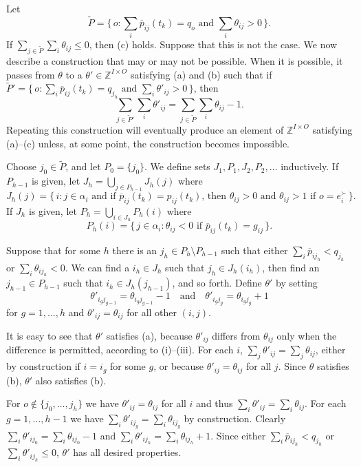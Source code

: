\documentclass[12pt]{article}
\theoremstyle{definition}
\newcommand{\In}{\mathbb{Z}}
\newcommand{\barp}{\overline{p}}
\newcommand{\tP}{{\tilde P}}
\begin{document}
\begin{appendix}
Let $$\tP = \{\, o : \text{$\sum_i \barp_{ij}(t_k) = q_{o}$ and
  $\sum_i \theta_{ij} > 0$} \,\}.$$ If $\sum_{j \in \tP} \sum_i
\theta_{ij} \le 0$, then (c) holds.  Suppose that this is not the
case.  We now describe a construction that may or may not be possible.
When it is possible, it passes from $\theta$ to a $\theta' \in \In^{I
  \times O}$ satisfying (a) and (b) such that if $\tP' = \{\, o :
\text{$\sum_i \barp_{ij}(t_k) = q_{j_h}$ and $\sum_i \theta'_{ij} >
  0$} \,\}$, then $$\sum_{j \in \tP'} \sum_i \theta'_{ij} = \sum_{j
  \in \tP} \sum_i \theta_{ij} - 1.$$ Repeating this construction will
eventually produce an element of $\In^{I \times O}$ satisfying
(a)--(c) unless, at some point, the construction becomes impossible.

Choose $j_0 \in \tP$, and let $P_0 = \{j_0\}$.  We define sets
$J_1,P_1, J_2, P_2, \ldots$ inductively.  If $P_{h-1}$ is given, let
$J_h = \bigcup_{j \in P_{h-1}} J_h(j)$ where
$$J_h(j) = \{\, i : \text{$j \in \alpha_i$ and if $\barp_{ij}(t_k) =
  p_{ij}(t_k)$, then $\theta_{ij} > 0$ and $\theta_{ij} > 1$ if $o =
  e^\succ_i$} \,\}.$$ If $J_h$ is given, let $P_h = \bigcup_{i \in
  J_h} P_h(i)$ where
$$P_h(i) = \{\, j \in \alpha_i : \text{$\theta_{ij} < 0$ if
  $\barp_{ij}(t_k) = g_{ij}$} \,\}.$$

Suppose that for some $h$ there is an $j_h \in P_h \setminus P_{h-1}$
such that either $\sum_i \barp_{ij_h} < q_{j_h}$ or $\sum_i
\theta_{ij_h} < 0$. We can find a $i_h \in J_h$ such that $j_h \in
J_h(i_h)$, then find an $j_{h-1} \in P_{h-1}$ such that $i_h \in
J_h(j_{h-1})$, and so forth. Define $\theta'$ by
setting $$\theta'_{i_gj_{g-1}} = \theta_{i_gj_{g-1}} - 1 \quad
\text{and} \quad \theta'_{i_gj_g} = \theta_{i_gj_g} + 1$$ for $g = 1,
\ldots, h$ and $\theta'_{ij} = \theta_{ij}$ for all other $(i,j)$.

It is easy to see that $\theta'$ satisfies (a), because $\theta'_{ij}$
differs from $\theta_{ij}$ only when the difference is permitted,
according to (i)--(iii).  For each $i$, $\sum_j \theta'_{ij} = \sum_j
\theta_{ij}$, either by construction if $i = i_g$ for some $g$, or
because $\theta'_{ij} = \theta_{ij}$ for all $j$.  Since $\theta$
satisfies (b), $\theta'$ also satisfies (b).

For $o \notin \{j_0, \ldots, j_h\}$ we have $\theta'_{ij} =
\theta_{ij}$ for all $i$ and thus $\sum_i \theta'_{ij} = \sum_i
\theta_{ij}$.  For each $g = 1, \ldots, h-1$ we have $\sum_i
\theta'_{ij_g} = \sum_i \theta_{ij_g}$ by construction.  Clearly $\sum_i
\theta'_{ij_0} = \sum_i \theta_{ij_0} - 1$ and $\sum_i \theta'_{ij_h}
= \sum_i \theta_{ij_h} + 1$.  Since either $\sum_i \barp_{ij_h} <
q_{j_h}$ or $\sum_i \theta'_{ij_h} \le 0$, $\theta'$ has all desired
properties.


\end{appendix}
\end{document}
